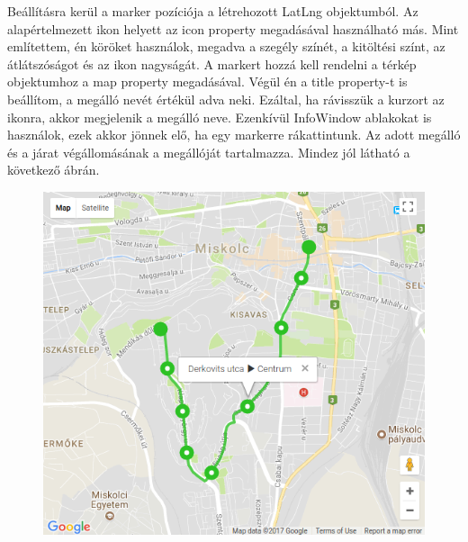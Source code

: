 
Beállításra kerül a marker pozíciója a létrehozott LatLng objektumból. Az alapértelmezett ikon helyett az icon property megadásával használható más. Mint említettem, én köröket használok, megadva a szegély színét, a kitöltési színt, az átlátszóságot és az ikon nagyságát. A markert hozzá kell rendelni a térkép objektumhoz a map property megadásával. Végül én a title property-t is beállítom, a megálló nevét értékül adva neki. Ezáltal, ha rávisszük a kurzort az ikonra, akkor megjelenik a megálló neve. Ezenkívül InfoWindow ablakokat is használok, ezek akkor jönnek elő, ha egy markerre rákattintunk. Az adott megálló és a járat végállomásának a megállóját tartalmazza. Mindez jól látható a következő ábrán.

\begin{figure}[htb]
\centering
\includegraphics[scale=0.7]{kepek/terkep.png}
\caption{}
\label{fig:terkep}
\end{figure}

